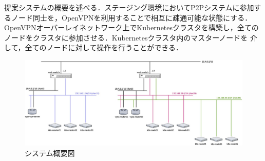 提案システムの概要を述べる．ステージング環境においてP2Pシステムに参加するノード同士を，OpenVPNを利用することで相互に疎通可能な状態にする．
OpenVPNオーバーレイネットワーク上でKubernetesクラスタを構築し，全てのノードをクラスタに参加させる．Kubernetesクラスタ内のマスターノードを
介して，全てのノードに対して操作を行うことができる．

\begin{figure}[htbp]
  \begin{center}
    \includegraphics[width=\textwidth]{./figures/system-diagram.jpg}
    \caption{システム概要図}
  \end{center}
\end{figure}

